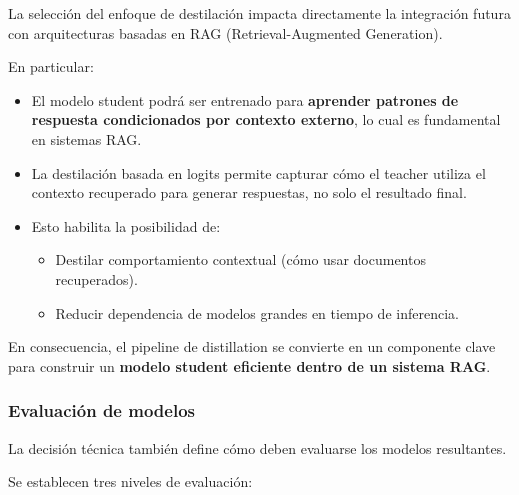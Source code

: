 \documentclass[12pt]{article}
\begin{document}
	La selección del enfoque de destilación impacta directamente la integración futura con arquitecturas basadas en RAG (Retrieval-Augmented Generation).
	
	En particular:
	
	\begin{itemize}
		\item El modelo student podrá ser entrenado para \textbf{aprender patrones de respuesta condicionados por contexto externo}, lo cual es fundamental en sistemas RAG.
		
		\item La destilación basada en logits permite capturar cómo el teacher utiliza el contexto recuperado para generar respuestas, no solo el resultado final.
		
		\item Esto habilita la posibilidad de:
		\begin{itemize}
			\item Destilar comportamiento contextual (cómo usar documentos recuperados).
			\item Reducir dependencia de modelos grandes en tiempo de inferencia.
		\end{itemize}
	\end{itemize}
	
	En consecuencia, el pipeline de distillation se convierte en un componente clave para construir un \textbf{modelo student eficiente dentro de un sistema RAG}.
	
	\subsubsection{Evaluación de modelos}
	
	La decisión técnica también define cómo deben evaluarse los modelos resultantes.
	
	Se establecen tres niveles de evaluación:
	
\end{document}
